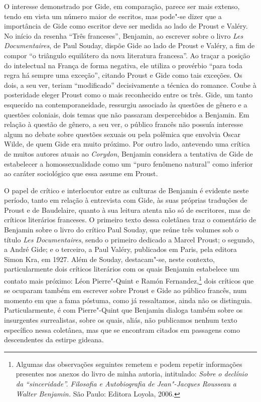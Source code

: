 O interesse demonstrado por Gide, em comparação, parece ser mais
extenso, tendo em vista um número maior de escritos, mas pode"-se dizer
que a importância de Gide como escritor deve ser medida ao lado de
Proust e Valéry. No início da resenha ``Três franceses'', Benjamin, ao
escrever sobre o livro \emph{Les Documentaires}, de Paul Souday, dispõe
Gide ao lado de Proust e Valéry, a fim de compor ``o triângulo
equilátero da nova literatura francesa''. Ao traçar a posição do
intelectual na França de forma negativa, ele utiliza o provérbio ``para
toda regra há sempre uma exceção'', citando Proust e Gide como tais
exceções. Os dois, a seu ver, teriam ``modificado'' decisivamente a
técnica do romance. Coube à posteridade eleger Proust como o mais
reconhecido entre os três. Gide, um tanto esquecido na
contemporaneidade, ressurgiu associado às questões de gênero e a
questões coloniais, dois temas que não passaram despercebidos a
Benjamin. Em relação à questão de gênero, a seu ver, o público francês
não possuía interesse algum no debate sobre questões sexuais ou pela
polêmica que envolvia Oscar Wilde, de quem Gide era muito próximo. Por
outro lado, antevendo uma crítica de muitos autores atuais ao
\emph{Corydon}, Benjamin considera a tentativa de Gide de estabelecer a
homossexualidade como um ``puro fenômeno natural'' como inferior ao
caráter sociológico que essa assume em Proust.

O papel de crítico e interlocutor entre as culturas de Benjamin é
evidente neste período, tanto em relação à entrevista com Gide, às suas
próprias traduções de Proust e de Baudelaire, quanto à sua leitura
atenta não só de escritores, mas de críticos literários franceses. O
primeiro texto dessa coletânea traz o comentário de Benjamin sobre o
livro do crítico Paul Souday, que reúne três volumes sob o título
\emph{Les Documentaires}, sendo o primeiro dedicado a Marcel Proust; o
segundo, a André Gide; e o terceiro, a Paul Valéry, publicados em Paris,
pela editora Simon Kra, em 1927. Além de Souday, destacam"-se, neste
contexto, particularmente dois críticos literários com os quais Benjamin
estabelece um contato mais próximo: Léon Pierre"-Quint e Ramón Fernandez,\footnote{Algumas das observações seguintes remetem e podem repetir
  informações presentes nos anexos do livro de minha autoria,
  intitulado: \emph{Sobre o declínio da ``sinceridade''. Filosofia e
  Autobiografia de Jean"-Jacques Rousseau a Walter Benjamin.} São Paulo:
  Editora Loyola, 2006.} dois críticos que se ocuparam também em
escrever sobre Proust e Gide ao público francês, num momento em que a
fama póstuma, como já ressaltamos, ainda não os distinguia.
Particularmente, é com Pierre"-Quint que Benjamin dialoga também sobre os
insurgentes surrealistas, sobre os quais, aliás, não publicamos nenhum
texto específico nessa coletânea, mas que se encontram citados em
passagens como descendentes da estirpe gideana.

